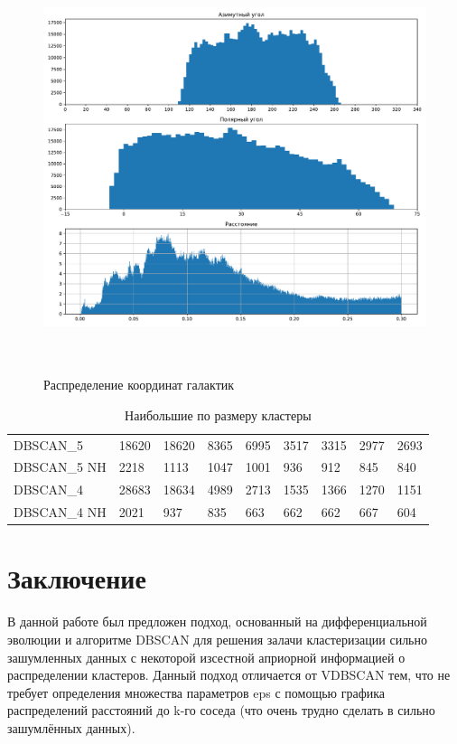 \documentclass[12pt,fleqn]{article}
\begin{document}
\begin{figure}[]
  \centering
  \includegraphics[width=12cm, height=12cm]{distrib.pdf}
  \caption{Распределение координат галактик}
  \label{errors_T(4)}
\end{figure}



\begin{table}[h]
\begin{center}
\begin{tabular}{|l|llllllll|}
\hline
DBSCAN\_5   & 18620 & 18620 & 8365 & 6995 & 3517 & 3315 & 2977 & 2693\\
DBSCAN\_5 NH& 2218 & 1113 & 1047 & 1001 & 936 & 912 & 845 & 840\\ \hline
DBSCAN\_4   & 28683 & 18634 &  4989 & 2713 & 1535 & 1366 & 1270 & 1151\\
DBSCAN\_4 NH& 2021 & 937 & 835 & 663 & 662 & 662 & 667 & 604\\
\hline
\end{tabular}
\caption{Наибольшие по размеру кластеры}\label{hugest_clusters}
\end{center}
\end{table}



\section{Заключение}

В данной работе был предложен подход, основанный на дифференциальной эволюции и алгоритме DBSCAN для решения залачи кластеризации сильно зашумленных данных с некоторой изсестной априорной информацией о распределении кластеров. Данный подход отличается от VDBSCAN тем, что не требует определения множества параметров eps с помощью графика распределений расстояний до k-го соседа (что очень трудно сделать в сильно зашумлённых данных).
\end{document}
